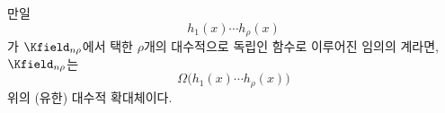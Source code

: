 
만일
\[
h_1(x)\cdots h_\rho(x)
\]
가 $\Kfield_{n\rho}$에서 택한 $\rho$개의 대수적으로 독립인 함수로 이루어진 임의의 계라면, $\Kfield_{n\rho}$는
\[
\Omega\bigl(h_1(x)\cdots h_\rho(x)\bigr)
\]
위의 (유한) 대수적 확대체이다.

